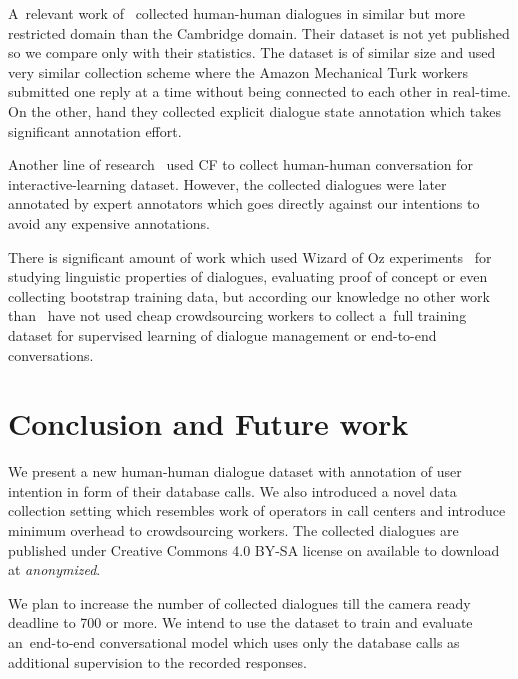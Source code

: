 \documentclass[runningheads,a4paper]{llncs}
\def\OD#1{{\color{darkgreen}OD: \it #1}}
\begin{document}
A~relevant work of~\cite{wen2016network} collected human-human dialogues in similar but more restricted domain than the Cambridge domain.
Their dataset is not yet published so we compare only with their statistics.
The dataset is of similar size and used very similar collection scheme where the Amazon Mechanical Turk workers submitted one reply at a time without being connected to each other in real-time.
On the other, hand they collected explicit dialogue state annotation which takes significant annotation effort.

Another line of research~\cite{vodolan2016data} used CF to collect human-human conversation for interactive-learning dataset.
However, the collected dialogues were later annotated by expert annotators which goes directly against our intentions to avoid any expensive annotations.

There is significant amount of work which used Wizard of Oz experiments~\cite{whittaker2002fish,walker1997evaluating,rieser2008learning} for studying linguistic properties of dialogues, evaluating proof of concept or even collecting bootstrap training data, but according our knowledge no other work than~\cite{wen2016network} have not used cheap crowdsourcing workers to collect a~full training dataset for supervised learning of dialogue management or end-to-end conversations.

\section{Conclusion and Future work} \label{sec:conc}
\vspace{-0.50em}
We present a new human-human dialogue dataset with annotation of user intention in form of their database calls.
We also introduced a novel data collection setting which resembles work of operators in call centers and introduce minimum overhead to crowdsourcing workers.
The collected dialogues are published under Creative Commons 4.0 BY-SA license on available to download at {\it anonymized}.  %

We plan to increase the number of collected dialogues till the camera ready deadline to 700 or more.
We intend to use the dataset to train and evaluate an~end-to-end conversational model which uses only the database calls as additional supervision to the recorded responses. 

\vspace{-1.00em}
\end{document}
